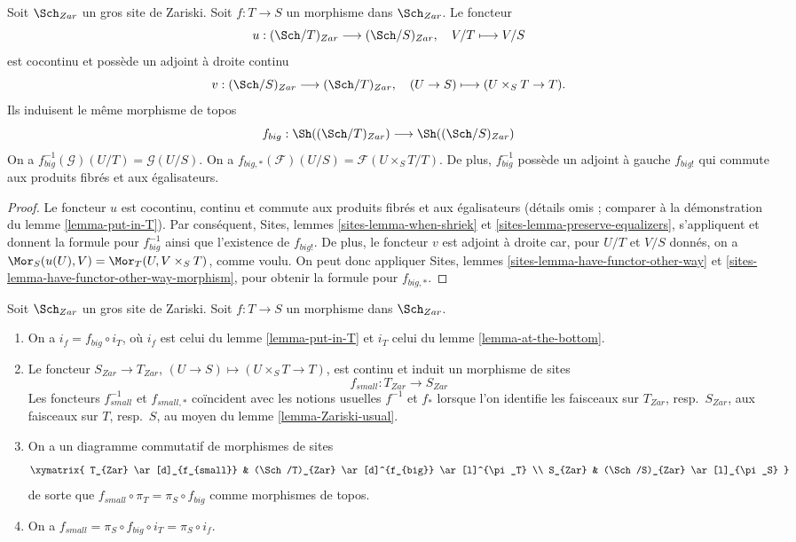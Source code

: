 \begin{lemma}
\label{lemma-morphism-big}
Soit $\Sch_{Zar}$ un gros site de Zariski.
Soit $f : T \to S$ un morphisme dans $\Sch_{Zar}$.
Le foncteur
$$
u : (\Sch/T)_{Zar} \longrightarrow (\Sch/S)_{Zar},
\quad
V/T \longmapsto V/S
$$
est cocontinu et possède un adjoint à droite continu
$$
v : (\Sch/S)_{Zar} \longrightarrow (\Sch/T)_{Zar},
\quad
(U \to S) \longmapsto (U \times_S T \to T).
$$
Ils induisent le même morphisme de topos
$$
f_{big} :
\Sh((\Sch/T)_{Zar})
\longrightarrow
\Sh((\Sch/S)_{Zar})
$$
On a $f_{big}^{-1}(\mathcal{G})(U/T) = \mathcal{G}(U/S)$.
On a $f_{big, *}(\mathcal{F})(U/S) = \mathcal{F}(U \times_S T/T)$.
De plus, $f_{big}^{-1}$ possède un adjoint à gauche $f_{big!}$ qui commute aux
produits fibrés et aux égalisateurs.
\end{lemma}

\begin{proof}
Le foncteur $u$ est cocontinu, continu et commute aux produits fibrés
et aux égalisateurs (détails omis ; comparer à la démonstration du
lemme \ref{lemma-put-in-T}).
Par conséquent,
Sites, lemmes \ref{sites-lemma-when-shriek} et
\ref{sites-lemma-preserve-equalizers},
s'appliquent et donnent la formule
pour $f_{big}^{-1}$ ainsi que l'existence de $f_{big!}$. De plus,
le foncteur $v$ est adjoint à droite car, pour $U/T$ et $V/S$ donnés,
on a $\Mor_S(u(U), V) = \Mor_T(U, V \times_S T)$,
comme voulu. On peut donc appliquer
Sites, lemmes \ref{sites-lemma-have-functor-other-way} et
\ref{sites-lemma-have-functor-other-way-morphism},
pour obtenir la formule pour $f_{big, *}$.
\end{proof}

\begin{lemma}
\label{lemma-morphism-big-small}
Soit $\Sch_{Zar}$ un gros site de Zariski.
Soit $f : T \to S$ un morphisme dans $\Sch_{Zar}$.
\begin{enumerate}
\item On a $i_f = f_{big} \circ i_T$, où $i_f$ est celui du
lemme \ref{lemma-put-in-T} et $i_T$ celui du
lemme \ref{lemma-at-the-bottom}.
\item Le foncteur $S_{Zar} \to T_{Zar}$,
$(U \to S) \mapsto (U \times_S T \to T)$, est continu et induit
un morphisme de sites
$$
f_{small} :
T_{Zar}
\longrightarrow
S_{Zar}
$$
Les foncteurs $f_{small}^{-1}$ et $f_{small, *}$ coïncident avec
les notions usuelles $f^{-1}$ et $f_*$ lorsque l'on identifie les faisceaux
sur $T_{Zar}$, resp.\ $S_{Zar}$, aux faisceaux sur $T$, resp.\ $S$,
au moyen du lemme \ref{lemma-Zariski-usual}.
\item On a un diagramme commutatif de morphismes de sites
$$
\xymatrix{
T_{Zar} \ar[d]_{f_{small}} &
(\Sch/T)_{Zar} \ar[d]^{f_{big}} \ar[l]^{\pi_T} \\
S_{Zar} &
(\Sch/S)_{Zar} \ar[l]_{\pi_S}
}
$$
de sorte que $f_{small} \circ \pi_T = \pi_S \circ f_{big}$ comme morphismes de topos.
\item On a $f_{small} = \pi_S \circ f_{big} \circ i_T = \pi_S \circ i_f$.
\end{enumerate}
\end{lemma}

